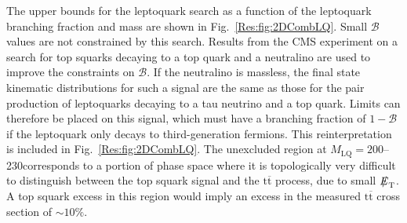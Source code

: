\documentclass[12pt]{thesis}  %
\newcommand{\MLQ}{\ensuremath{M_{\text{LQ}}}\xspace}
\def\eslash{\ensuremath{{\hbox{$E$\kern-0.6em\lower-.05ex\hbox{/}\kern0.10em}}}}
\def\met{\mbox{$\eslash_\text{T}$}\xspace} %
\renewcommand{\ttbar}{\ensuremath{\mathrm{t}\overline{\mathrm{t}}}\xspace}
\begin{document}
The upper bounds for the leptoquark search as a function of the leptoquark branching fraction and mass are shown in Fig.~\ref{Res:fig:2DCombLQ}. Small $\mathcal{B}$ values are not constrained by this search. Results from the CMS experiment on a search for top squarks decaying to a top quark and a neutralino \cite{SUS-13-011} are used to improve the constraints on $\mathcal{B}$. If the neutralino is massless, the final state kinematic distributions for such a signal are the same as those for the pair production of leptoquarks decaying to a tau neutrino and a top quark. Limits can therefore be placed on this signal, which must have a branching fraction of $1-\mathcal{B}$ if the leptoquark only decays to third-generation fermions. This reinterpretation is included in Fig.~\ref{Res:fig:2DCombLQ}. The unexcluded region at $\MLQ=200$--230\GeV corresponds to a portion of phase space where it is topologically very difficult to distinguish between the top squark signal and the \ttbar process, due to small \met. A top squark excess in this region would imply an excess in the measured \ttbar cross section of ${\sim}10\%$.
\end{document}
